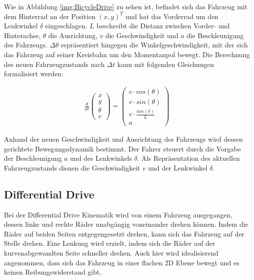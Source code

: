 Wie in Abbildung \ref{img:BicycleDrive} zu sehen ist, befindet sich das Fahrzeug mit dem
Hinterrad an der Position $(x, y)^T$ und hat das Vorderrad um den Lenkwinkel $\delta$
eingeschlagen. $L$ beschreibt die Distanz zwischen Vorder- und Hinterachse, $\theta$
die Ausrichtung, $v$ die Geschwindigkeit und $a$ die Beschleunigung des Fahrzeugs.
$\Delta \theta$ repräsentiert hingegen die Winkelgeschwindigkeit, mit der sich das Fahrzeug
auf seiner Kreisbahn um den Momentanpol bewegt. Die Berechnung des neuen Fahrzeugzustands
nach $\Delta t$ kann mit folgenden Gleichungen formalisiert werden:

\begin{equation}
\begin{aligned}
\frac{d}{dt} \begin{pmatrix} x \\ y \\ \theta \\ v \end{pmatrix}
= \begin{pmatrix} v \cdot cos(\theta) \\ v \cdot sin(\theta)
    \\ v \cdot \frac{tan(\delta)}{L} \\ a \end{pmatrix}
\end{aligned}
\end{equation}

Anhand der neuen Geschwindigkeit und Ausrichtung des Fahrzeugs wird dessen gerichtete
Bewegungsdynamik bestimmt. Der Fahrer steuert durch die Vorgabe der Beschleunigung $a$
und des Lenkwinkels $\delta$. Als Repräsentation des aktuellen Fahrzeugzustands dienen
die Geschwindigkeit $v$ und der Lenkwinkel $\delta$.

\subsection{Differential Drive}\label{sec:DiffDrive}
Bei der Differential Drive Kinematik wird von einem Fahrzeug
ausgegangen, dessen linke und rechte Räder unabgängig voneinander drehen können.
Indem die Räder auf beiden Seiten entgegengesetzt drehen, kann sich das Fahrzeug
auf der Stelle drehen. Eine Lenkung wird erzielt, indem sich die Räder auf der
kurvenabgewandten Seite schneller drehen. Auch hier wird idealisierend angenommen,
dass sich das Fahrzeug in einer flachen 2D Ebene bewegt und es keinen
Reibungswiderstand gibt.\\

